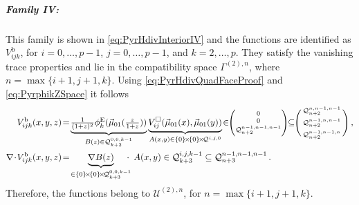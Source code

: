 \subparagraph{Family IV:}
This family is shown in \eqref{eq:PyrHdivInteriorIV} and the functions are identified as $V_{ijk}^\mathrm{b}$, for $i=0,\ldots,p-1$, $j=0,\ldots,p-1$, and $k=2,\ldots,p$.
They satisfy the vanishing trace properties and lie in the compatibility space $\Gamma^{(2),n}$, where $n=\max\{i+1,j+1,k\}$.
Using \eqref{eq:PyrHdivQuadFaceProof} and \eqref{eq:PyrphikZSpace} it follows
\begin{equation}
\begin{aligned}
	V_{ijk}^\mathrm{b}(x,y,z)&\!=\!
		\underbrace{\textstyle{\frac{1}{(1+z)^2}}\phi_k^\E(\vec{\mu}_{01}(\szzz))}_{B(z)\in\mathcal{Q}_{k+2}^{0,0,k-1}}
			\underbrace{V_{ij}^\square(\vec{\mu}_{01}(x),\vec{\mu}_{01}(y))}_{A(x,y)\in\{0\}\!\times\!\{0\}\!\times\!\mathcal{Q}^{i,j,0}}
			\!\in\!\!\Bigg(\!\begin{smallmatrix}0\\[2pt]0\\[2pt]\mathcal{Q}_{n+2}^{n-1,n-1,n-1}\end{smallmatrix}\!\Bigg)
				\!\!\subseteq\!\!\Bigg(\begin{smallmatrix}\mathcal{Q}_{n+2}^{n,n-1,n-1}\\[2pt]\mathcal{Q}_{n+2}^{n-1,n,n-1}\\[2pt]
					\mathcal{Q}_{n+2}^{n-1,n-1,n}\end{smallmatrix}\Bigg)\,,\\
	\nabla\!\cdot\! V_{ijk}^\mathrm{b}(x,y,z)&\!=\!
		\underbrace{\nabla B(z)}_{
			\in\{0\}\!\times\!\{0\}\!\times\!\mathcal{Q}_{k+3}^{0,0,k-1}}
				\!\!\!\!\cdot\,\,\, A(x,y)\in\mathcal{Q}_{k+3}^{i,j,k-1}
					\subseteq\mathcal{Q}_{n+3}^{n-1,n-1,n-1}\,.
\end{aligned}
\end{equation}
Therefore, the functions belong to $\mathcal{U}^{(2),n}$, for $n=\max\{i+1,j+1,k\}$.

